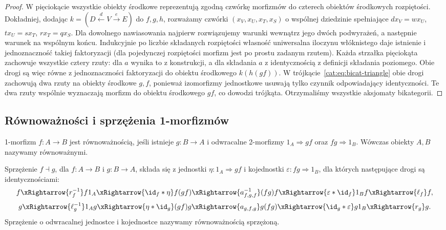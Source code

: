 \begin{proof}
W pięciokącie wszystkie obiekty środkowe reprezentują zgodną czwórkę morfizmów do czterech obiektów środkowych rozpiętości. Dokładniej, dodając $k=(D\xleftarrow{d}V\xrightarrow{e}E)$ do $f,g,h$, rozważamy czwórki $(x_V,x_U,x_T,x_S)$ o wspólnej dziedzinie spełniające $dx_V=wx_U$, $tx_U=sx_T$, $rx_T=qx_S$. Dla dowolnego nawiasowania najpierw rozwiązujemy warunki wewnątrz jego dwóch podwyrażeń, a następnie warunek na wspólnym końcu. Indukcyjnie po liczbie składanych rozpiętości własność uniwersalna iloczynu włóknistego daje istnienie i jednoznaczność takiej faktoryzacji (dla pojedynczej rozpiętości morfizm jest po prostu zadanym rzutem). Każda strzałka pięciokąta zachowuje wszystkie cztery rzuty: dla $a$ wynika to z konstrukcji, a dla składania $a$ z identycznością z definicji składania poziomego. Obie drogi są więc równe z jednoznaczności faktoryzacji do obiektu środkowego $k(h(gf))$. W trójkącie~\eqref{cat:eq:bicat-triangle} obie drogi zachowują dwa rzuty na obiekty środkowe $g,f$, ponieważ izomorfizmy jednostkowe usuwają tylko czynnik odpowiadający identyczności. Te dwa rzuty wspólnie wyznaczają morfizm do obiektu środkowego $gf$, co dowodzi trójkąta. Otrzymaliśmy wszystkie aksjomaty bikategorii.
\end{proof}

\subsection{Równoważności i sprzężenia 1-morfizmów}

\begin{definicja}\label{cat:def:bicat-equivalence}
1-morfizm $f:A\to B$ jest równoważnością, jeśli istnieje $g:B\to A$ i odwracalne 2-morfizmy $1_A\Rightarrow gf$ oraz $fg\Rightarrow1_B$. Wówczas obiekty $A,B$ nazywamy równoważnymi.
\end{definicja}

\begin{definicja}\label{cat:def:bicat-adjunction}
Sprzężenie $f\dashv g$, dla $f:A\to B$ i $g:B\to A$, składa się z jednostki $\eta:1_A\Rightarrow gf$ i kojednostki $\varepsilon:fg\Rightarrow1_B$, dla których następujące drogi są identycznościami:
\begin{equation}\label{cat:eq:bicat-adj-triangle-f}
 f\xRightarrow{r_f^{-1}} f1_A
 \xRightarrow{\id_f\ast\eta} f(gf)
 \xRightarrow{a_{f,g,f}^{-1}}(fg)f
 \xRightarrow{\varepsilon\ast\id_f}1_Bf
 \xRightarrow{\ell_f}f,
\end{equation}
\begin{equation}\label{cat:eq:bicat-adj-triangle-g}
 g\xRightarrow{\ell_g^{-1}}1_Ag
 \xRightarrow{\eta\ast\id_g}(gf)g
 \xRightarrow{a_{g,f,g}}g(fg)
 \xRightarrow{\id_g\ast\varepsilon}g1_B
 \xRightarrow{r_g}g.
\end{equation}
Sprzężenie o odwracalnej jednostce i kojednostce nazywamy równoważnością sprzężoną.
\end{definicja}

